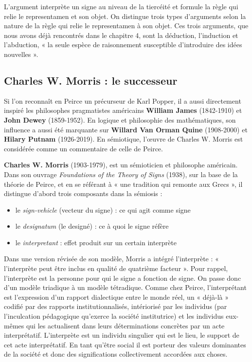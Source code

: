 L’argument interprète un signe au niveau de la tiercéité et formule la règle qui relie le representamen et son objet. On distingue trois types d’arguments selon la nature de la règle qui relie le representamen à son objet. Ces trois arguments, que nous avons déjà rencontrés dans le chapitre 4, sont la déduction, l’induction et l’abduction, « la seule espèce de raisonnement susceptible d’introduire des idées nouvelles ».

\subsection{Charles W. Morris : le successeur}
Si l’on reconnaît en Peirce un précurseur de Karl Popper, il a aussi directement inspiré les philosophes pragmatistes américains \textbf{William James} (1842-1910) et \textbf{John Dewey} (1859-1952). En logique et philosophie des mathématiques, son influence a aussi été marquante sur \textbf{Willard Van Orman Quine} (1908-2000) et \textbf{Hilary Putnam} (1926-2019). En sémiotique, l’œuvre de Charles W. Morris est considérée comme un commentaire de celle de Peirce.

\textbf{Charles W. Morris} (1903-1979), est un sémioticien et philosophe américain. Dans son ouvrage \textit{Foundations of the Theory of Signs} (1938), sur la base de la théorie de Peirce, et en se référant à « une tradition qui remonte aux Grecs », il distingue d’abord trois composants dans la sémiosis :
\begin{itemize}
\item le \textit{sign-vehicle} (vecteur du signe) : ce qui agit comme signe
\item le \textit{designatum} (le designé) : ce à quoi le signe réfère
\item le \textit{interpretant} : effet produit sur un certain interprète
\end{itemize}
Dans une version révisée de son modèle, Morris a intégré l’interprète : « l’interprète peut être inclus en qualité de quatrième facteur ». Pour rappel, l’interprète est la personne pour qui le signe a fonction de signe. On passe donc d’un modèle triadique à un modèle tétradique. Comme chez Peirce, l’interprétant est l’expression d’un rapport dialectique entre le monde réel, un « déjà-là » codifié par des rapports institutionnalisés, intériorisé par les individus (par l’inculcation pédagogique qu’exerce la société institutrice) et les individus eux-mêmes qui les actualisent dans leurs déterminations concrètes par un acte interprétatif. L’interprète est un individu singulier qui est le lieu, le support de cet acte interprétatif. En tant qu’être social il est porteur des valeurs dominantes de la société et donc des significations collectivement accordées aux choses.

